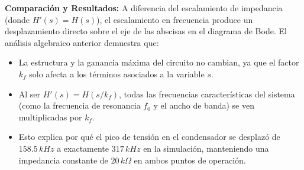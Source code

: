 \textbf{Comparación y Resultados:}
A diferencia del escalamiento de impedancia (donde $H'(s) = H(s)$), el escalamiento en frecuencia produce un desplazamiento directo sobre el eje de las abscisas en el diagrama de Bode. El análisis algebraico anterior demuestra que:
\begin{itemize}
	\item La estructura y la ganancia máxima del circuito no cambian, ya que el factor $k_f$ solo afecta a los términos asociados a la variable $s$.
	\item Al ser $H'(s) = H(s/k_f)$, todas las frecuencias características del sistema (como la frecuencia de resonancia $f_0$ y el ancho de banda) se ven multiplicadas por $k_f$.
	\item Esto explica por qué el pico de tensión en el condensador se desplazó de $158.5 \, kHz$ a exactamente $317 \, kHz$ en la simulación, manteniendo una impedancia constante de $20 \, k\Omega$ en ambos puntos de operación.
\end{itemize}


